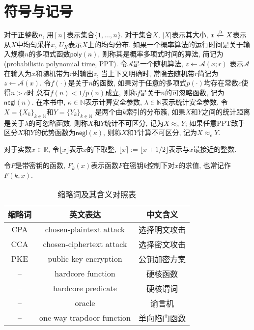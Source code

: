 \section{符号与记号}
对于正整数$n$, 用$[n]$表示集合$\{1, \dots, n\}$.
对于集合$X$, $|X|$表示其大小, $x \xleftarrow{\textup{\tiny R}} X$表示从$X$中均匀采样$x$, 
$U_X$表示$X$上的均匀分布. 
如果一个概率算法的运行时间是关于输入规模$n$的多项式函数$\mathsf{poly}(n)$, 则称其是概率多项式时间的算法, 
简记为(probabilistic polynomial time, PPT).
令$\mathcal{A}$是一个随机算法, $z \leftarrow \mathcal{A}(x;r)$
表示$\mathcal{A}$在输入为$x$和随机带为$r$时输出$z$, 当上下文明确时, 常隐去随机带$r$简记为
$z \leftarrow \mathcal{A}(x)$.  
令$f(\cdot)$是关于$n$的函数, 如果对于任意的多项式$p(\cdot)$均存在常数$c$使得$n > c$时
总有$f(n) < 1/p(n)$成立, 则称$f$是关于$n$的可忽略函数, 记为$\mathsf{negl}(n)$.  
在本书中, $\kappa \in \mathbb{N}$表示计算安全参数, $\lambda \in \mathbb{N}$表示统计安全参数. 
令$X = \{X_k\}_{k \in \mathbb{N}}$和$Y = \{Y_k\}_{k \in \mathbb{N}}$
是两个由$k$索引的分布簇, 如果$X$和$Y$之间的统计距离是关于$\lambda$的可忽略函数, 
则称$X$和$Y$统计不可区分, 记为$X \approx_s Y$; 
如果任意PPT敌手区分$X$和$Y$的优势函数为$\mathsf{negl}(\kappa)$, 则称$X$和$Y$计算不可区分, 记为$X \approx_c Y$. 


对于实数$x \in \mathbb{R}$, 令$\lfloor x \rfloor$表示$x$的下取整, 
$\lfloor x \rceil := \lfloor x + 1/2\rfloor$表示与$x$最接近的整数.

令$F$是带密钥的函数, $F_k(x)$表示函数$F$在密钥$k$控制下对$x$的求值, 也常记作$F(k, x)$.  

\begin{table}[H]
\begin{center}
\caption{缩略词及其含义对照表}
\begin{tabular}{ccc}
\hline
缩略词   & 英文表达 & 中文含义\\
\hline
CPA     & chosen-plaintext attack  		& 选择明文攻击\\
CCA     & chosen-ciphertext attack 		& 选择密文攻击\\
PKE     & public-key encryption    		& 公钥加密方案\\
--      & hardcore function        		& 硬核函数\\ 
--      & hardcore predicate       		& 硬核谓词\\  
--      & oracle                   		& 谕言机\\
--      & one-way trapdoor function 	& 单向陷门函数\\
\hline
\end{tabular}
\end{center}
\end{table}



